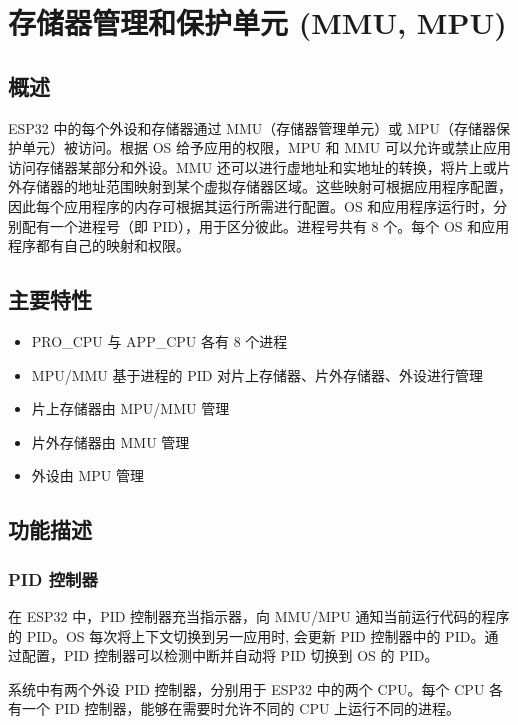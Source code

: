 \documentclass[main\_\_CN.tex]{subfiles}
\begin{document}
\hypertarget{mpummu}{}
\chapter{存储器管理和保护单元 (MMU, MPU)}
\label{mod:mmumpu}

\section{概述}

ESP32 中的每个外设和存储器通过 MMU（存储器管理单元）或 MPU（存储器保护单元）被访问。根据 OS 给予应用的权限，MPU 和 MMU 可以允许或禁止应用访问存储器某部分和外设。MMU 还可以进行虚地址和实地址的转换，将片上或片外存储器的地址范围映射到某个虚拟存储器区域。这些映射可根据应用程序配置，因此每个应用程序的内存可根据其运行所需进行配置。OS 和应用程序运行时，分别配有一个进程号（即 PID），用于区分彼此。进程号共有 8 个。每个 OS 和应用程序都有自己的映射和权限。

\section{主要特性}

\begin{itemize}
    \item PRO\_CPU 与 APP\_CPU 各有 8 个进程
    \item MPU/MMU 基于进程的 PID 对片上存储器、片外存储器、外设进行管理
    \item 片上存储器由 MPU/MMU 管理
    \item 片外存储器由 MMU 管理
    \item 外设由 MPU 管理
\end{itemize}


\section{功能描述}

\subsection{PID 控制器}

在 ESP32 中，PID 控制器充当指示器，向 MMU/MPU 通知当前运行代码的程序的 PID。OS 每次将上下文切换到另一应用时, 会更新 PID 控制器中的 PID。通过配置，PID 控制器可以检测中断并自动将 PID 切换到 OS 的 PID。

系统中有两个外设 PID 控制器，分别用于 ESP32 中的两个 CPU。每个 CPU 各有一个 PID 控制器，能够在需要时允许不同的 CPU 上运行不同的进程。
\end{document}
